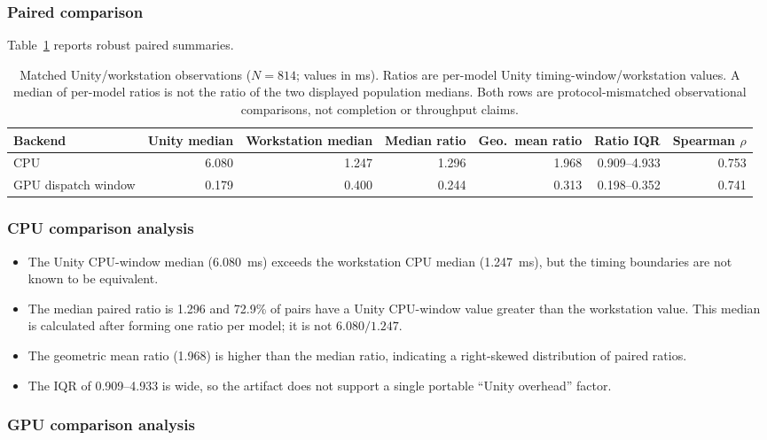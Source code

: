 \documentclass[10pt,twocolumn]{article}
\begin{document}
\subsubsection{Paired comparison}

Table~\ref{tab:workstation} reports robust paired summaries.

\begin{table}[t]
\centering\scriptsize
\setlength{\tabcolsep}{3pt}
\begin{tabular}{@{}lrrrrrr@{}}
\toprule
Backend & Unity median & Workstation median & Median ratio & Geo.\ mean ratio & Ratio IQR & Spearman $\rho$ \\
\midrule
CPU & 6.080 & 1.247 & 1.296 & 1.968 & 0.909--4.933 & 0.753 \\
GPU dispatch window & 0.179 & 0.400 & 0.244 & 0.313 & 0.198--0.352 & 0.741 \\
\bottomrule
\end{tabular}
\caption{Matched Unity/workstation observations ($N = 814$; values in ms). Ratios are per-model Unity timing-window/workstation values. A median of per-model ratios is not the ratio of the two displayed population medians. Both rows are protocol-mismatched observational comparisons, not completion or throughput claims.}
\label{tab:workstation}
\end{table}

\subsubsection{CPU comparison analysis}

\begin{itemize}[nosep,leftmargin=*]
  \item The Unity CPU-window median (6.080~ms) exceeds the workstation CPU median (1.247~ms), but the timing boundaries are not known to be equivalent.
  \item The median paired ratio is 1.296 and 72.9\% of pairs have a Unity CPU-window value greater than the workstation value. This median is calculated after forming one ratio per model; it is not $6.080/1.247$.
  \item The geometric mean ratio (1.968) is higher than the median ratio, indicating a right-skewed distribution of paired ratios.
  \item The IQR of 0.909--4.933 is wide, so the artifact does not support a single portable ``Unity overhead'' factor.
\end{itemize}

\subsubsection{GPU comparison analysis}
\end{document}
